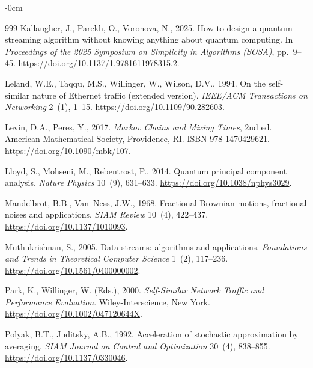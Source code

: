 \documentclass[sensors,article,submit,pdftex,moreauthors]{Definitions/mdpi}
\providecommand{\DIFaddbegin}{} %
\providecommand{\DIFaddend}{} %
\providecommand{\DIFdelbegin}{} %
\providecommand{\DIFdelend}{} %
\begin{document}
\begin{adjustwidth}{-\extralength}{0cm}
\begin{thebibliography}{999}
Kallaugher, J., Parekh, O., Voronova, N., 2025.
\newblock How to design a quantum streaming algorithm without knowing anything about quantum computing.
\newblock In \emph{Proceedings of the 2025 Symposium on Simplicity in Algorithms (SOSA)}, pp.~9--45.
\newblock \DIFdelbegin %
\DIFdelend \DIFaddbegin \url{https://doi.org/10.1137/1.9781611978315.2}\DIFaddend .

Leland, W.E., Taqqu, M.S., Willinger, W., Wilson, D.V., 1994.
\newblock On the self-similar nature of Ethernet traffic (extended version).
\newblock \emph{IEEE/ACM Transactions on Networking} 2~(1), 1--15.
\newblock \url{https://doi.org/10.1109/90.282603}.

Levin, D.A., Peres, Y., 2017.
\newblock \emph{Markov Chains and Mixing Times}, 2nd ed.
\newblock American Mathematical Society, Providence, RI. ISBN 978-1470429621.
\newblock \url{https://doi.org/10.1090/mbk/107}.

Lloyd, S., Mohseni, M., Rebentrost, P., 2014.
\newblock Quantum principal component analysis.
\newblock \emph{Nature Physics} 10~(9), 631--633.
\newblock \url{https://doi.org/10.1038/nphys3029}.

Mandelbrot, B.B., Van~Ness, J.W., 1968.
\newblock Fractional Brownian motions, fractional noises and applications.
\newblock \emph{SIAM Review} 10~(4), 422--437.
\newblock \url{https://doi.org/10.1137/1010093}.

Muthukrishnan, S., 2005.
\newblock Data streams: algorithms and applications.
\newblock \emph{Foundations and Trends in Theoretical Computer Science} 1~(2), 117--236.
\newblock \url{https://doi.org/10.1561/0400000002}.

Park, K., Willinger, W. (Eds.), 2000.
\newblock \emph{Self-Similar Network Traffic and Performance Evaluation}.
\newblock Wiley-Interscience, New York.
\newblock \url{https://doi.org/10.1002/047120644X}.

Polyak, B.T., Juditsky, A.B., 1992.
\newblock Acceleration of stochastic approximation by averaging.
\newblock \emph{SIAM Journal on Control and Optimization} 30~(4), 838--855.
\newblock \url{https://doi.org/10.1137/0330046}.


\end{thebibliography}
\end{adjustwidth}
\end{document}
